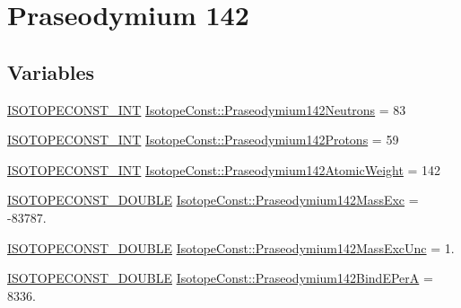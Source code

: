 \hypertarget{group___isotope_const-_praseodymium-_pr142}{}\section{Praseodymium 142}
\label{group___isotope_const-_praseodymium-_pr142}
\subsection*{Variables}
\begin{DoxyCompactItemize}
\item 
\mbox{\hyperlink{group___isotope_const-_macros_ga5f18360b3e99483a35c32d789e62621c}{I\+S\+O\+T\+O\+P\+E\+C\+O\+N\+S\+T\+\_\+\+I\+NT}} \mbox{\hyperlink{group___isotope_const-_praseodymium-_pr142_ga869d62e82799e0f4d3193ba283ce26ea}{Isotope\+Const\+::\+Praseodymium142\+Neutrons}} = 83
\item 
\mbox{\hyperlink{group___isotope_const-_macros_ga5f18360b3e99483a35c32d789e62621c}{I\+S\+O\+T\+O\+P\+E\+C\+O\+N\+S\+T\+\_\+\+I\+NT}} \mbox{\hyperlink{group___isotope_const-_praseodymium-_pr142_ga3cc236b22d15c9b313f349158d3e4d96}{Isotope\+Const\+::\+Praseodymium142\+Protons}} = 59
\item 
\mbox{\hyperlink{group___isotope_const-_macros_ga5f18360b3e99483a35c32d789e62621c}{I\+S\+O\+T\+O\+P\+E\+C\+O\+N\+S\+T\+\_\+\+I\+NT}} \mbox{\hyperlink{group___isotope_const-_praseodymium-_pr142_ga734020c59b382fb95e06c9a924cb8ef1}{Isotope\+Const\+::\+Praseodymium142\+Atomic\+Weight}} = 142
\item 
\mbox{\hyperlink{group___isotope_const-_macros_ga8f45a7272ce02c0b4c65c44636ed719a}{I\+S\+O\+T\+O\+P\+E\+C\+O\+N\+S\+T\+\_\+\+D\+O\+U\+B\+LE}} \mbox{\hyperlink{group___isotope_const-_praseodymium-_pr142_gafdf2941940642e96bff48a0768954ca9}{Isotope\+Const\+::\+Praseodymium142\+Mass\+Exc}} = -\/83787.
\item 
\mbox{\hyperlink{group___isotope_const-_macros_ga8f45a7272ce02c0b4c65c44636ed719a}{I\+S\+O\+T\+O\+P\+E\+C\+O\+N\+S\+T\+\_\+\+D\+O\+U\+B\+LE}} \mbox{\hyperlink{group___isotope_const-_praseodymium-_pr142_gaeeedd57e29a9d7f773ad54618aef5bca}{Isotope\+Const\+::\+Praseodymium142\+Mass\+Exc\+Unc}} = 1.
\item 
\mbox{\hyperlink{group___isotope_const-_macros_ga8f45a7272ce02c0b4c65c44636ed719a}{I\+S\+O\+T\+O\+P\+E\+C\+O\+N\+S\+T\+\_\+\+D\+O\+U\+B\+LE}} \mbox{\hyperlink{group___isotope_const-_praseodymium-_pr142_ga4898b877e2997d1e513f8dd7a3cd486b}{Isotope\+Const\+::\+Praseodymium142\+Bind\+E\+PerA}} = 8336.

\end{DoxyCompactItemize}
